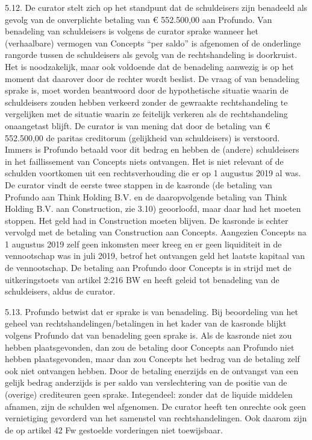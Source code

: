 \documentclass[
  dutch,
  a4paper,
]{article}
\begin{document}
5.12. De curator stelt zich op het standpunt dat de schuldeisers zijn benadeeld als gevolg van de onverplichte betaling van € 552.500,00 aan Profundo. Van benadeling van schuldeisers is volgens de curator sprake wanneer het (verhaalbare) vermogen van Concepts ``per saldo'' is afgenomen of de onderlinge rangorde tussen de schuldeisers als gevolg van de rechtshandeling is doorkruist. Het is noodzakelijk, maar ook voldoende dat de benadeling aanwezig is op het moment dat daarover door de rechter wordt beslist. De vraag of van benadeling sprake is, moet worden beantwoord door de hypothetische situatie waarin de schuldeisers zouden hebben verkeerd zonder de gewraakte rechtshandeling te vergelijken met de situatie waarin ze feitelijk verkeren als de rechtshandeling onaangetast blijft. De curator is van mening dat door de betaling van € 552.500,00 de paritas creditorum (gelijkheid van schuldeisers) is verstoord. Immers is Profundo betaald voor dit bedrag en hebben de (andere) schuldeisers in het faillissement van Concepts niets ontvangen. Het is niet relevant of de schulden voortkomen uit een rechtsverhouding die er op 1 augustus 2019 al was. De curator vindt de eerste twee stappen in de kasronde (de betaling van Profundo aan Think Holding B.V. en de daaropvolgende betaling van Think Holding B.V. aan Construction, zie 3.10) geoorloofd, maar daar had het moeten stoppen. Het geld had in Construction moeten blijven. De kasronde is echter vervolgd met de betaling van Construction aan Concepts. Aangezien Concepts na 1 augustus 2019 zelf geen inkomsten meer kreeg en er geen liquiditeit in de vennootschap was in juli 2019, betrof het ontvangen geld het laatste kapitaal van de vennootschap. De betaling aan Profundo door Concepts is in strijd met de uitkeringstoets van artikel 2:216 BW en heeft geleid tot benadeling van de schuldeisers, aldus de curator.

5.13. Profundo betwist dat er sprake is van benadeling. Bij beoordeling van het geheel van rechtshandelingen/betalingen in het kader van de kasronde blijkt volgens Profundo dat van benadeling geen sprake is. Als de kasronde niet zou hebben plaatsgevonden, dan zou de betaling door Concepts aan Profundo niet hebben plaatsgevonden, maar dan zou Concepts het bedrag van de betaling zelf ook niet ontvangen hebben. Door de betaling enerzijds en de ontvangst van een gelijk bedrag anderzijds is per saldo van verslechtering van de positie van de (overige) crediteuren geen sprake. Integendeel: zonder dat de liquide middelen afnamen, zijn de schulden wel afgenomen. De curator heeft ten onrechte ook geen vernietiging gevorderd van het samenstel van rechtshandelingen. Ook daarom zijn de op artikel 42 Fw gestoelde vorderingen niet toewijsbaar.
\end{document}
